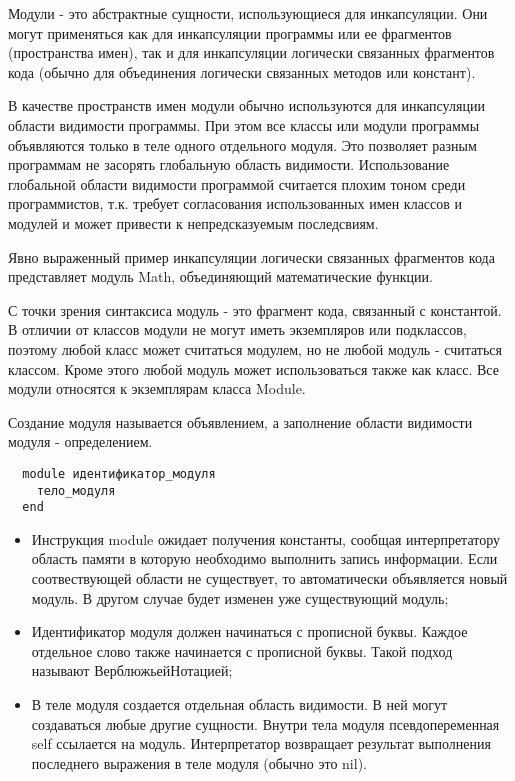 Модули - это абстрактные сущности, использующиеся для инкапсуляции. Они могут применяться как для инкапсуляции программы или ее фрагментов (пространства имен), так и для инкапсуляции логически связанных фрагментов кода (обычно для объединения логически связанных методов или констант).
\begin{note}
  В качестве пространств имен модули обычно используются для инкапсуляции области видимости программы. При этом все классы или модули программы объявляются только в теле одного отдельного модуля. Это позволяет разным программам не засорять глобальную область видимости. Использование глобальной области видимости программой считается плохим тоном среди программистов, т.к. требует согласования использованных имен классов и модулей и может привести к непредсказуемым последсвиям.

  Явно выраженный пример инкапсуляции логически связанных фрагментов кода представляет модуль Math, объединяющий математические функции.
\end{note}

С точки зрения синтаксиса модуль - это фрагмент кода, связанный с константой. В отличии от классов модули не могут иметь экземпляров или подклассов, поэтому любой класс может считаться модулем, но не любой модуль - считаться классом. Кроме этого любой модуль может использоваться также как класс. Все модули относятся к экземплярам класса Module.

Создание модуля называется объявлением, а заполнение области видимости модуля - определением.
\begin{verbatim}
  module идентификатор_модуля
    тело_модуля
  end
\end{verbatim}
\begin{itemize}
  \item Инструкция module ожидает получения константы, сообщая интерпретатору область памяти в которую необходимо выполнить запись информации. Если соотвествующей области не существует, то автоматически объявляется новый модуль. В другом случае будет изменен уже существующий модуль;

  \item Идентификатор модуля должен начинаться с прописной буквы. Каждое отдельное слово также начинается с прописной буквы. Такой подход называют ВерблюжьейНотацией;

  \item В теле модуля создается отдельная область видимости. В ней могут создаваться любые другие сущности. Внутри тела модуля псевдопеременная self ссылается на модуль. Интерпретатор возвращает результат выполнения последнего выражения в теле модуля (обычно это nil).
\end{itemize}

